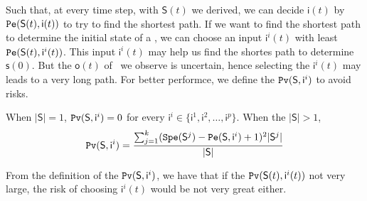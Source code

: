 Such that, at every time step, with $\mathsf{S}(t)$ we derived, we can decide $\mathsf{i}(t)$ by ${\tt Pe}(\mathsf{S}(t),\mathsf{ i}(t))$ to try to find the shortest path. If we want to find the shortest path to determine the initial state of a \BCN, we can choose an input $\mathsf{ i}^{i}(t)$ with least ${\tt Pe}(\mathsf{S}(t), \mathsf{ i}^{i}(t))$. This input $\mathsf{i}^{i}(t)$ may help us find the shortes path to determine $\mathsf{s}(0)$. But the $\mathsf{o}(t)$ of \BCNs\ we observe is uncertain, hence selecting the $\mathsf{ i}^{i}(t)$ may leads to a very long path. For better performce, we define the ${\tt Pv}(\mathsf{S}, \mathsf{ i}^{i})$ to avoid risks.
\begin{definition} 
When $|\mathsf{S}|=1$, 
${\tt Pv}(\mathsf{S}, \mathsf{ i}^{i})=0$ for every $\mathsf{ i}^{i} \in \{\mathsf{ i}^{1},\mathsf{ i}^{2},\ldots, \mathsf{ i}^{p}\}$.  When the $|\mathsf{S}|>1$, 
\begin{equation}
\begin{split}
{\tt Pv}(\mathsf{S}, \mathsf{ i}^{i})=\frac{\sum_{j=1}^k ({\tt Spe}(\mathsf{S}^{j})-{\tt Pe}(\mathsf{S}, \mathsf{ i}^{i})+1)^2 |\mathsf{S}^{j}|}{ |\mathsf{S}|}
\end{split}
\end{equation}
\end{definition}

From the definition of the ${\tt Pv}(\mathsf{S}, \mathsf{ i}^{i})$, we have that if the ${\tt Pv}(\mathsf{S}(t), \mathsf{i}^{i}(t))$ not very large, the risk of choosing $\mathsf{ i}^{i}(t)$ would be not very great either.
